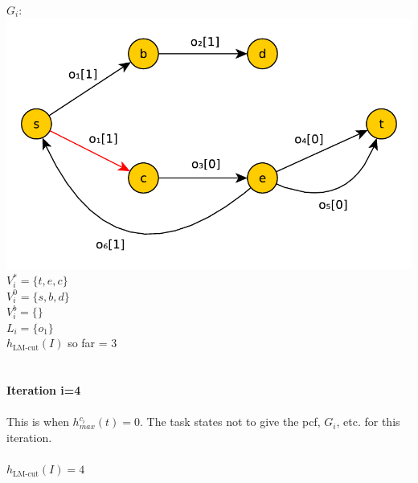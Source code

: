 \documentclass[11pt,a4paper]{article}
\begin{document}
\\
$G_i:$\\
\includegraphics[scale=0.5]{jugraph3}\\
$V^*_i=\{t,e,c\}$\\
$V^0_i=\{s,b,d\}$\\
$V^b_i=\{\}$\\
$L_i=\{o_1\}$\\
$h_{\text{LM-cut}}(I)$ so far = 3\\
\\
\\
\textbf{Iteration i=4}\\
\\
This is when $h^{c_i}_{max}(t)=0$. The task states not to give the pcf, $G_i$, etc. for this iteration.\\
\\
$h_{\text{LM-cut}}(I)=4$
\end{document}
